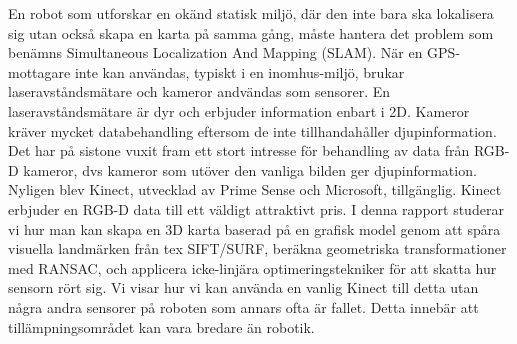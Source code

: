 En robot som utforskar en ok\"{a}nd statisk milj\"{o}, d\"{a}r den inte bara ska
lokalisera sig utan ocks\r{a} skapa en karta p\r{a} samma g\r{a}ng, m\r{a}ste hantera
det problem som ben\"{a}mns Simultaneous Localization And Mapping (SLAM).
N\"{a}r en GPS-mottagare inte kan anv\"{a}ndas, typiskt i en inomhus-milj\"{o},
brukar laseravst\r{a}ndsm\"{a}tare och kameror andv\"{a}ndas som sensorer. En
laseravst\r{a}ndsm\"{a}tare \"{a}r dyr och erbjuder information enbart i 2D. Kameror
kr\"{a}ver mycket databehandling eftersom de inte tillhandah\r{a}ller
djupinformation. Det har p\r{a} sistone vuxit fram ett stort intresse f\"{o}r
behandling av data fr\r{a}n RGB-D kameror, dvs kameror som ut\"{o}ver den
vanliga bilden ger djupinformation. Nyligen blev Kinect, utvecklad av
Prime Sense och Microsoft, tillg\"{a}nglig. Kinect erbjuder en RGB-D data
till ett v\"{a}ldigt attraktivt pris. I denna rapport studerar vi hur man
kan skapa en 3D karta baserad p\r{a} en grafisk model genom att sp\r{a}ra
visuella landm\"{a}rken fr\r{a}n tex SIFT/SURF, ber\"{a}kna geometriska
transformationer med RANSAC, och applicera icke-linj\"{a}ra
optimeringstekniker f\"{o}r att skatta hur sensorn r\"{o}rt sig. Vi visar hur vi
kan anv\"{a}nda en vanlig Kinect till detta utan n\r{a}gra andra sensorer p\r{a}
roboten som annars ofta \"{a}r fallet. Detta inneb\"{a}r att till\"{a}mpningsomr\r{a}det
kan vara bredare \"{a}n robotik.
